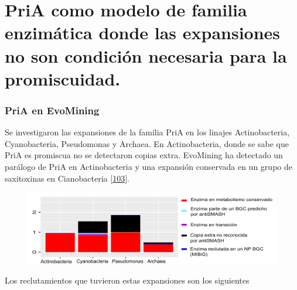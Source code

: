 \documentclass[12pt,twoside]{reedthesis}
\begin{document}
  \clearpage   
  
  \section{PriA como modelo de familia enzimática donde las expansiones no
  son condición necesaria para la
  promiscuidad.}\label{pria-como-modelo-de-familia-enzimatica-donde-las-expansiones-no-son-condicion-necesaria-para-la-promiscuidad.}
  
  \subsubsection{PriA en EvoMining}\label{pria-en-evomining}
  
  Se investigaron las expansiones de la familia PriA en los linajes
  Actinobacteria, Cyanobacteria, Pseudomonas y Archaea. En Actinobacteria,
  donde se sabe que PriA es promiscua no se detectaron copias extra.
  EvoMining ha detectado un parálogo de PriA en Actinobacteria y una
  expansión conservada en un grupo de saxitoxinas en Cianobacteria
  {[}\protect\hyperlink{ref-moustafa_origin_2009}{103}{]}.
  
  \begin{figure}[h!tbp]
  \centering
  \includegraphics[angle = 0,scale = 0.8]{chapter4/PriAExpansiones.png}
  \caption[Expansiones de PriA en Actinobacteria, Cyanobacteria, Pseudomonas y Archaea]{\footnotesize{}}
  \label{fig:Expansiones de PriA en Actinobacteria, Cyanobacteria, Pseudomonas y Archaea}
  \end{figure}
  
  Los reclutamientos que tuvieron estas expansiones son los siguientes
  
\end{document}
